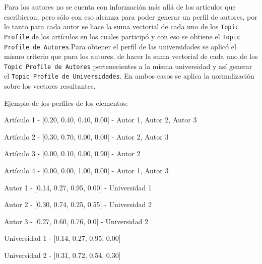 Para los autores no se cuenta con información más allá de los artículos que escribieron, pero sólo con eso alcanza para poder generar un perfil de autores, por lo tanto para cada autor se hace la suma vectorial de cada uno de los \texttt{Topic Profile} de los artículos en los cuales participó y con eso se obtiene el \texttt{Topic Profile de Autores}.Para obtener el perfil de las universidades se aplicó el mismo criterio que para los autores, de hacer la suma vectorial de cada uno de los \texttt{Topic Profile de Autores} pertenecientes a la misma universidad y así generar el \texttt{Topic Profile de Universidades}. En ambos casos se aplica la normalización sobre los vectores resultantes.

Ejemplo de los perfiles de los elementos:

\begin{description}
 \item[Artículo - Topic Profile - Autores]
 \item Artículo 1 - $[$0.20, 0.40, 0.40, 0.00$]$ - Autor 1, Autor 2, Autor 3
 \item Artículo 2 - $[$0.30, 0.70, 0.00, 0.00$]$ - Autor 2, Autor 3
 \item Artículo 3 - $[$0.00, 0.10, 0.00, 0.90$]$ - Autor 2
 \item Artículo 4 - $[$0.00, 0.00, 1.00, 0.00$]$ - Autor 1, Autor 3
\end{description}

\begin{description}
 \item[Autor - Topic Profile - Universidad]
 \item Autor 1 - $[$0.14, 0.27, 0.95, 0.00$]$ - Universidad 1
 \item Autor 2 - $[$0.30, 0.74, 0.25, 0.55$]$ - Universidad 2
 \item Autor 3 - $[$0.27, 0.60, 0.76, 0.0$]$ - Universidad 2
\end{description}

\begin{description}
 \item[Universidad - Topic Profile]
 \item Universidad 1 - $[$0.14, 0.27, 0.95, 0.00$]$
 \item Universidad 2 - $[$0.31, 0.72, 0.54, 0.30$]$
\end{description}

